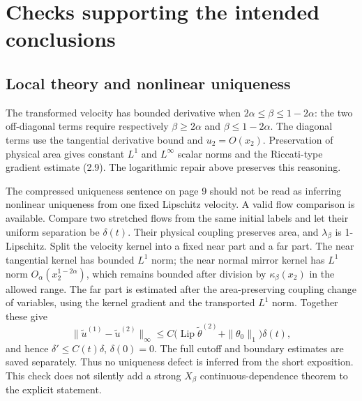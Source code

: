 \documentclass[10pt]{article}
\begin{document}
\section*{Checks supporting the intended conclusions}
\subsection*{Local theory and nonlinear uniqueness}
The transformed velocity has bounded derivative when \(2\alpha\le\beta\le1-2\alpha\): the two off-diagonal terms require respectively \(\beta\ge2\alpha\) and \(\beta\le1-2\alpha\). The diagonal terms use the tangential derivative bound and \(u_2=O(x_2)\). Preservation of physical area gives constant \(L^1\) and \(L^\infty\) scalar norms and the Riccati-type gradient estimate (2.9). The logarithmic repair above preserves this reasoning.\par
The compressed uniqueness sentence on page 9 should not be read as inferring nonlinear uniqueness from one fixed Lipschitz velocity. A valid flow comparison is available. Compare two stretched flows from the same initial labels and let their uniform separation be \(\delta(t)\). Their physical coupling preserves area, and \(\lambda_\beta\) is 1-Lipschitz. Split the velocity kernel into a fixed near part and a far part. The near tangential kernel has bounded \(L^1\) norm; the near normal mirror kernel has \(L^1\) norm \(O_\alpha(x_2^{1-2\alpha})\), which remains bounded after division by \(\kappa_\beta(x_2)\) in the allowed range. The far part is estimated after the area-preserving coupling change of variables, using the kernel gradient and the transported \(L^1\) norm. Together these give \[\|\widetilde u^{(1)}-\widetilde u^{(2)}\|_\infty
 \le C\bigl(\operatorname{Lip}\widetilde\theta^{(2)}
                   +\|\theta_0\|_1\bigr)\delta(t),\] and hence \(\delta'\le C(t)\delta\), \(\delta(0)=0\). The full cutoff and boundary estimates are saved separately. Thus no uniqueness defect is inferred from the short exposition. This check does not silently add a strong \(X_\beta\) continuous-dependence theorem to the explicit statement.\par
\end{document}
